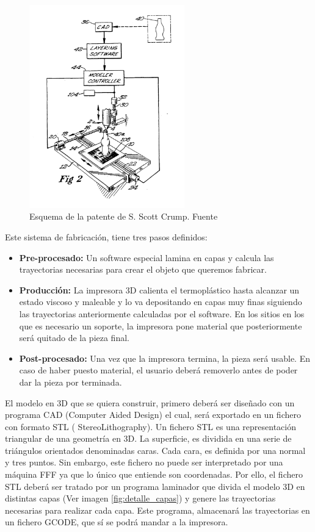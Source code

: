     \begin{figure}[H]
            \centering
            \includegraphics[width=0.6\textwidth]{images/estado.arte/US5340433-2.png}
            \caption{Esquema de la patente de S. Scott Crump. Fuente  \cite{crump1992apparatus}}
            \label{fig:impr_patente_sistema}
    \end{figure}

Este sistema de fabricación, tiene tres pasos definidos:
\begin{itemize}
    \item \textbf{Pre-procesado:} Un software especial lamina en capas y calcula las trayectorias necesarias para crear el objeto que queremos fabricar.
    \item \textbf{Producción:} La impresora 3D calienta el termoplástico hasta alcanzar un estado viscoso y maleable y lo va depositando en capas muy finas siguiendo las trayectorias anteriormente calculadas por el software. En los sitios en los que es necesario un soporte, la impresora pone material que posteriormente será quitado de la pieza final.
    \item \textbf{Post-procesado:} Una vez que la impresora termina, la pieza será usable. En caso de haber puesto material, el usuario deberá removerlo antes de poder dar la pieza por terminada.
\end{itemize}

El modelo en 3D que se quiera construir, primero deberá ser diseñado con un programa CAD (Computer Aided Design) el cual, será exportado en un fichero con formato STL ( StereoLithography). Un fichero STL es una representación triangular de una geometría en 3D. La superficie, es dividida en una serie de triángulos orientados denominadas caras. Cada cara, es definida por una normal y tres puntos\cite{stl}. Sin embargo, este fichero no puede ser interpretado por una máquina FFF ya que lo único que entiende son coordenadas. Por ello, el fichero STL deberá ser tratado por un programa laminador que divida el modelo 3D en distintas capas (Ver imagen \ref{fig:detalle_capas}) y genere las trayectorias necesarias para realizar cada capa. Este programa, almacenará las trayectorias en un fichero GCODE, que sí se podrá mandar a la impresora.

